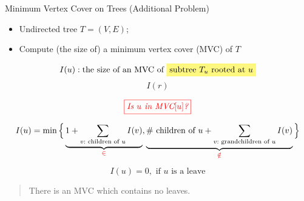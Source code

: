 
\begin{frame}{}
  \begin{exampleblock}{Minimum Vertex Cover on Trees (Additional Problem)}
    \begin{itemize}
      \item Undirected tree $T = (V, E)$;  
      \item Compute (the size of) a minimum vertex cover (MVC) of $T$
    \end{itemize}
  \end{exampleblock}

  \vspace{0.50cm}

  \pause
  \vspace{0.50cm}
  \centerline{}
\end{frame}
\begin{frame}{}
  \[
    I(u): \text{the size of an MVC of \hl{yellow}{subtree $T_{u}$ rooted at $u$}}
  \]
  \[
    I(r)
  \]

  \pause
  \[
    \textcolor{red}{\fbox{\it Is $u$ in $\text{MVC}[u]$?}}
  \]

  \pause
  \begin{align*} 
    I(u) = \min \Big\{
      \underbrace{1 + \sum_{v: \text{ children of } u} I(v)}_{\textcolor{red}{\in}},
      \underbrace{\text{\# children of } u + \sum_{v: \text{ grandchildren of } u} I(v)}_{\textcolor{red}{\notin}}
    \Big\}
  \end{align*}

  \pause
  \[
    I(u) = 0, \text{ if $u$ is a leave}
  \]
\end{frame}

\begin{frame}{}

  \pause
  \vspace{0.50cm}
  \begin{quote}
    \centering
    There is an MVC which contains no leaves.
  \end{quote}
  
  \pause
  \vspace{0.20cm}
  \begin{center}
  \end{center}
\end{frame}
